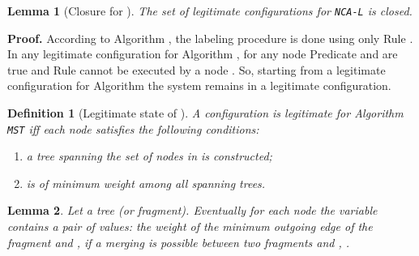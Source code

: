 \documentclass[11pt,a4paper]{article}
\newtheorem{definition}{Definition}
\newtheorem{lemma}{Lemma}
\newenvironment{proof}{\noindent \begin{rm}{\textbf{Proof.} }}{\hspace*{\fill}\par\end{rm}}
\newcommand{\MST}{\mbox{\tt MST}}
\newcommand{\LabA}{\mbox{\tt NCA-L}}
\begin{document}
\begin{lemma}[Closure for ]
\label{lem:label_closure}
The set of legitimate configurations for \LabA\/ is closed.
\end{lemma}

\begin{proof}
According to Algorithm , the labeling procedure is done using only Rule . In any legitimate configuration for Algorithm , for any node  Predicate  and  are true and Rule  cannot be executed by a node . So, starting from a legitimate configuration for Algorithm  the system remains in a legitimate configuration.
\end{proof}

\begin{definition}[Legitimate state of ]
\label{def:mst_legitimate_configuration}
A configuration is legitimate for Algorithm \MST\/ iff each node  satisfies the following conditions:
\begin{enumerate}
\item a tree  spanning the set of nodes in  is constructed;
\item  is of minimum weight among all spanning trees.
\end{enumerate}
\end{definition}



\begin{lemma}
\label{lem:mwoe_computation}
Let  a tree (or fragment). Eventually for each node  the variable  contains a pair of values: the weight of the minimum outgoing edge  of the fragment  and , if a merging is possible between two fragments  and , .
\end{lemma}
\end{document}
